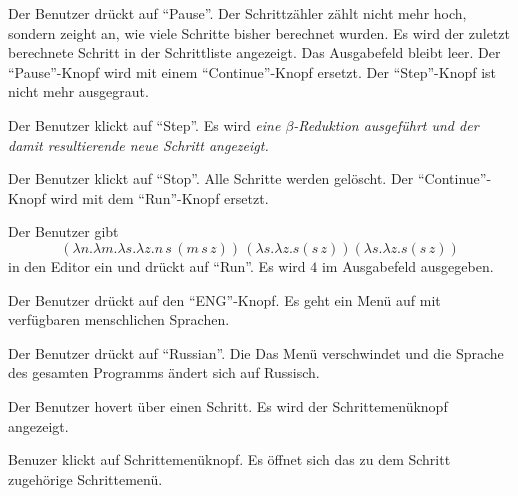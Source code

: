 \documentclass[parskip=full,11pt,twoside]{scrartcl}
\begin{document}
{Der Benutzer drückt auf \enquote{Pause}.}
{Der Schrittzähler zählt nicht mehr hoch, sondern zeight an, wie viele Schritte bisher berechnet wurden.
Es wird der zuletzt berechnete Schritt in der Schrittliste angezeigt. Das Ausgabefeld bleibt leer.
\newline Der \enquote{Pause}-Knopf wird mit einem \enquote{Continue}-Knopf ersetzt.
\newline Der \enquote{Step}-Knopf ist nicht mehr ausgegraut.}

{Der Benutzer klickt auf \enquote{Step}.}
{Es wird \em{eine} $\beta$-Reduktion ausgeführt und der damit resultierende neue Schritt angezeigt.}

{Der Benutzer klickt auf \enquote{Stop}.}
{Alle Schritte werden gelöscht.
Der \enquote{Continue}-Knopf wird mit dem \enquote{Run}-Knopf ersetzt.}




{Der Benutzer gibt $$(\lambda n.\lambda m.\lambda s.\lambda z.n\,s\,(m\,s\,z))\,(\lambda s.\lambda z.s(s\,z)) (\lambda s.\lambda z.s(s \, z))$$ in den Editor ein und drückt auf \enquote{Run}.}
{Es wird $4$ im Ausgabefeld ausgegeben.}




{Der Benutzer drückt auf den \enquote{ENG}-Knopf.}
{Es geht ein Menü auf mit verfügbaren menschlichen Sprachen.}

{Der Benutzer drückt auf \enquote{Russian}.}
{Die Das Menü verschwindet und die Sprache des gesamten Programms ändert sich auf Russisch.}

{Der Benutzer hovert über einen Schritt.}
{Es wird der Schrittemenüknopf angezeigt.}

{Benuzer klickt auf Schrittemenüknopf.}
{Es öffnet sich das zu dem Schritt zugehörige Schrittemenü.}
\end{document}
